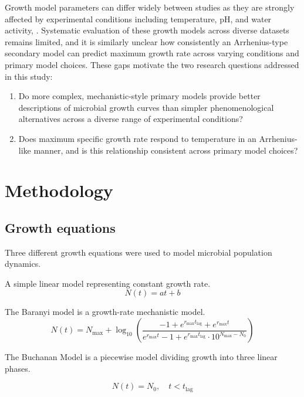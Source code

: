 \documentclass[11pt]{article}
\begin{document}
Growth model parameters can differ widely between studies as they are strongly affected by 
experimental conditions including temperature, pH, and water activity, 
\citep{peleg2011microbial}. Systematic evaluation of these growth models across diverse 
datasets remains limited, and it is similarly unclear how consistently an Arrhenius-type 
secondary model can predict maximum growth rate across varying conditions and primary model 
choices. These gaps motivate the two research questions addressed in this study:

\begin{enumerate}
\item Do more complex, mechanistic-style primary models provide better descriptions of microbial growth curves than simpler phenomenological alternatives across a diverse range of experimental conditions?
\item Does maximum specific growth rate respond to temperature in an Arrhenius-like manner, and is this relationship consistent across primary model choices?
\end{enumerate}

\section{Methodology}

\subsection{Growth equations}

Three different growth equations were used to model microbial population dynamics.

A simple linear model representing constant growth rate.
\begin{equation}
N(t) = at + b
\label{eq:linear}
\end{equation}

The Baranyi model \citep{grijspeerdt1999estimating} is a growth-rate mechanistic model.
\begin{equation}
N(t) = N_{\text{max}} + \log_{10}\left(\frac{-1 + e^{r_{\text{max}} t_{\text{lag}}} + e^{r_{\text{max}} t}}{e^{r_{\text{max}} t} - 1 + e^{r_{\text{max}} t_{\text{lag}}} \cdot 10^{N_{\text{max}} - N_0}}\right)
\label{eq:baranyi}
\end{equation}

The Buchanan Model \citep{buchanan1997simple} is a piecewise model dividing growth into three linear phases.

\begin{equation}
N(t) = N_0, \quad t < t_{\text{lag}}
\end{equation}
\end{document}
